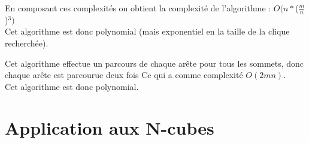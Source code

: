 \documentclass[a4paper, 11pt]{article}
\begin{document}
    En composant ces complexités on obtient la complexité de l'algorithme : $O(n*$($\frac{m}{n}$)$^3)$\\
    Cet algorithme est donc polynomial (mais exponentiel en la taille de la clique recherchée).

    \label{subsubsec:Q3E3}
    Cet algorithme effectue un parcours de chaque arête pour tous les sommets, donc chaque arête est parcourue deux fois
    Ce qui a comme complexité $O(2mn)$.\\
    Cet algorithme est donc polynomial.

    \section{Application aux N-cubes}\label{sec:application-aux-n-cubes}
\end{document}
